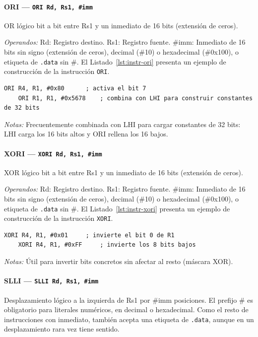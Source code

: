 \documentclass[../main.tex]{subfiles}
\begin{document}
\paragraph*{ORI --- \texttt{ORI Rd, Rs1, \#imm}}
OR lógico bit a bit entre Rs1 y un inmediato de 16 bits (extensión de ceros).

\textit{Operandos:} Rd: Registro destino. Rs1: Registro fuente. \#imm: Inmediato de 16 bits sin signo (extensión de ceros), decimal (\#10) o hexadecimal (\#0x100), o etiqueta de \texttt{.data} sin \#.
El Listado~\ref{lst:instr-ori} presenta un ejemplo de construcción de la instrucción \texttt{ORI}.

\begin{lstlisting}[caption={ORI},label={lst:instr-ori}]
	ORI R4, R1, #0x80      ; activa el bit 7
	ORI R1, R1, #0x5678    ; combina con LHI para construir constantes de 32 bits
\end{lstlisting}
\textit{Notas:} Frecuentemente combinada con LHI para cargar constantes de 32 bits: LHI carga los 16 bits altos y ORI rellena los 16 bajos.

\paragraph*{XORI --- \texttt{XORI Rd, Rs1, \#imm}}
XOR lógico bit a bit entre Rs1 y un inmediato de 16 bits (extensión de ceros).

\textit{Operandos:} Rd: Registro destino. Rs1: Registro fuente. \#imm: Inmediato de 16 bits sin signo (extensión de ceros), decimal (\#10) o hexadecimal (\#0x100), o etiqueta de \texttt{.data} sin \#.
El Listado~\ref{lst:instr-xori} presenta un ejemplo de construcción de la instrucción \texttt{XORI}.

\begin{lstlisting}[caption={XORI},label={lst:instr-xori}]
	XORI R4, R1, #0x01     ; invierte el bit 0 de R1
	XORI R4, R1, #0xFF     ; invierte los 8 bits bajos
\end{lstlisting}
\textit{Notas:} Útil para invertir bits concretos sin afectar al resto (máscara XOR).

\paragraph*{SLLI --- \texttt{SLLI Rd, Rs1, \#imm}}
Desplazamiento lógico a la izquierda de Rs1 por \#imm posiciones. El prefijo \# es obligatorio para literales numéricos, en decimal o hexadecimal. Como el resto de instrucciones con inmediato, también acepta una etiqueta de \texttt{.data}, aunque en un desplazamiento rara vez tiene sentido.
\end{document}
